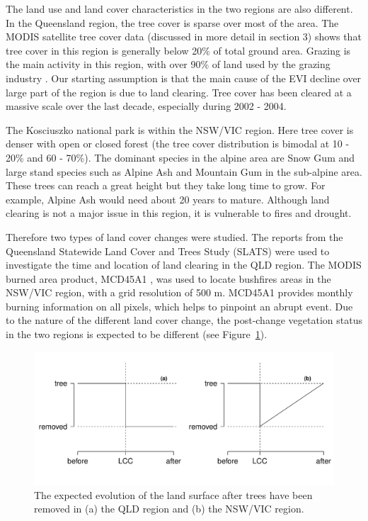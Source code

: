 \documentclass[authoryear,preprint,review,12pt]{elsarticle}
\begin{document}
The land use and land cover characteristics in the two regions are also different. In the Queensland region, the tree cover is sparse over most of the area. The MODIS satellite tree cover data (discussed in more detail in section 3) shows that tree cover in this region is generally below 20\% of total ground area. Grazing is the main activity in this region, with over 90\% of land used by the grazing industry \citep{ABARES2010}. Our starting assumption is that the main cause of the EVI  decline over large part of the region is due to land clearing. Tree cover has been cleared at a massive scale over the last decade, especially during 2002 - 2004.  

The Kosciuszko national park is within the NSW/VIC region. Here tree cover is denser with open or closed forest (the tree cover distribution is bimodal at 10 - 20\% and 60 - 70\%). The dominant species in the alpine area are Snow Gum and large stand species such as Alpine Ash and Mountain Gum in the sub-alpine area. These trees can reach a great height but they take long time to grow. For example, Alpine Ash would need about 20 years to mature. Although land clearing is not a major issue in this region, it is vulnerable to fires and drought. 

Therefore two types of land cover changes were studied. The reports from the Queensland Statewide Land Cover and Trees Study (SLATS) \citep[e.g.][]{SLATS2001,SLATS2003} were used to investigate the time and location of land clearing in the QLD region. The MODIS burned area product, MCD45A1 \citep{Roy2002,Roy2005,Roy2008}, was used to locate bushfires areas in the NSW/VIC region, with a grid resolution of 500 m. MCD45A1 provides monthly burning information on all pixels, which helps to pinpoint an abrupt event. Due to the nature of the different land cover change, the post-change vegetation status in the two regions is expected to be different (see Figure~\ref{fig:tc_simple}). 

\begin{figure}[ht!]
  \centerline{\includegraphics[scale=0.65]{tc_simple.pdf}}
  \caption{The expected evolution of the land surface after trees have been removed in (a) the QLD region and (b) the NSW/VIC region.}
  \label{fig:tc_simple}
\end{figure}
\end{document}
